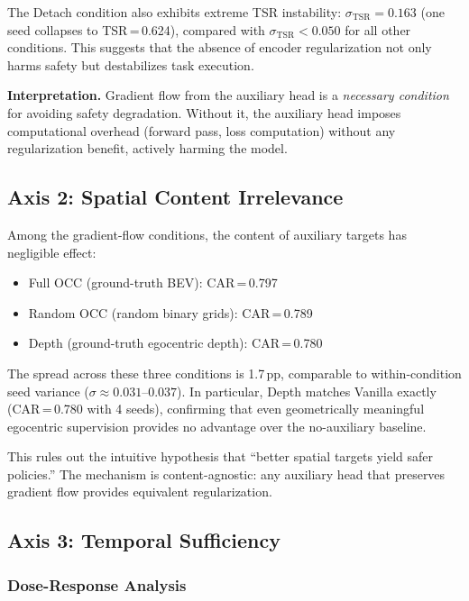 \documentclass[10pt,twocolumn]{article}
\begin{document}
The Detach condition also exhibits extreme TSR instability: $\sigma_\text{TSR} = 0.163$ (one seed collapses to TSR\,=\,0.624), compared with $\sigma_\text{TSR} < 0.050$ for all other conditions.
This suggests that the absence of encoder regularization not only harms safety but destabilizes task execution.

\textbf{Interpretation.}\quad
Gradient flow from the auxiliary head is a \emph{necessary condition} for avoiding safety degradation.
Without it, the auxiliary head imposes computational overhead (forward pass, loss computation) without any regularization benefit, actively harming the model.

\subsection{Axis 2: Spatial Content Irrelevance}
\label{sec:axis2}

Among the gradient-flow conditions, the content of auxiliary targets has negligible effect:
\begin{itemize}
\item Full OCC (ground-truth BEV): CAR\,=\,0.797
\item Random OCC (random binary grids): CAR\,=\,0.789
\item Depth (ground-truth egocentric depth): CAR\,=\,0.780
\end{itemize}

The spread across these three conditions is 1.7\,pp, comparable to within-condition seed variance ($\sigma \approx 0.031$--$0.037$).
In particular, Depth matches Vanilla exactly (CAR\,=\,0.780 with 4 seeds), confirming that even geometrically meaningful egocentric supervision provides no advantage over the no-auxiliary baseline.

This rules out the intuitive hypothesis that ``better spatial targets yield safer policies.''
The mechanism is content-agnostic: any auxiliary head that preserves gradient flow provides equivalent regularization.

\subsection{Axis 3: Temporal Sufficiency}
\label{sec:axis3}

\subsubsection{Dose-Response Analysis}
\end{document}
